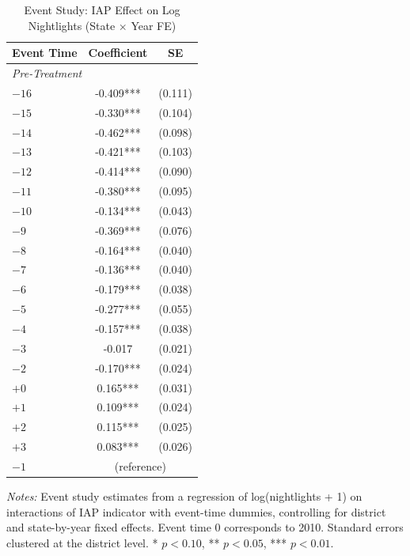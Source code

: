 \begin{table}[H]
\centering
\caption{Event Study: IAP Effect on Log Nightlights (State $\times$ Year FE)}
\label{tab:event}
\begin{threeparttable}
\begin{tabular}{lcc}
\toprule
Event Time & Coefficient & SE \\
\midrule
\multicolumn{3}{l}{\textit{Pre-Treatment}} \\
$-16$ & -0.409*** & (0.111) \\
$-15$ & -0.330*** & (0.104) \\
$-14$ & -0.462*** & (0.098) \\
$-13$ & -0.421*** & (0.103) \\
$-12$ & -0.414*** & (0.090) \\
$-11$ & -0.380*** & (0.095) \\
$-10$ & -0.134*** & (0.043) \\
$-9$ & -0.369*** & (0.076) \\
$-8$ & -0.164*** & (0.040) \\
$-7$ & -0.136*** & (0.040) \\
$-6$ & -0.179*** & (0.038) \\
$-5$ & -0.277*** & (0.055) \\
$-4$ & -0.157*** & (0.038) \\
$-3$ & -0.017 & (0.021) \\
$-2$ & -0.170*** & (0.024) \\
$+0$ & 0.165*** & (0.031) \\
$+1$ & 0.109*** & (0.024) \\
$+2$ & 0.115*** & (0.025) \\
$+3$ & 0.083*** & (0.026) \\
\midrule
$-1$ & \multicolumn{2}{c}{(reference)} \\
\bottomrule
\end{tabular}
\begin{tablenotes}[flushleft]
\small
\item \textit{Notes:} Event study estimates from a regression of log(nightlights + 1) on interactions of IAP indicator with event-time dummies, controlling for district and state-by-year fixed effects. Event time 0 corresponds to 2010. Standard errors clustered at the district level. * $p<0.10$, ** $p<0.05$, *** $p<0.01$.
\end{tablenotes}
\end{threeparttable}
\end{table}

